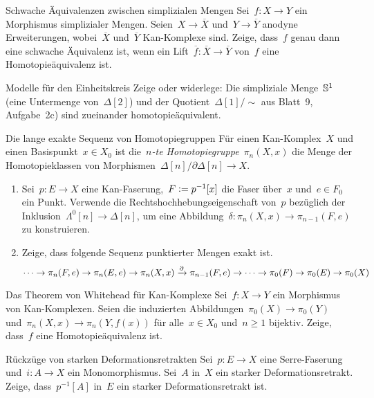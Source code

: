 \documentclass{uebblatt}
\begin{document}

\begin{aufgabe}{Schwache Äquivalenzen zwischen simplizialen Mengen}
Sei~$f : X \to Y$ ein Morphismus simplizialer Mengen. Seien~$X \to
\overline{X}$ und~$Y \to \overline{Y}$ anodyne Erweiterungen,
wobei~$\overline{X}$ und~$\overline{Y}$ Kan-Komplexe sind. Zeige, dass~$f$
genau dann eine schwache Äquivalenz ist, wenn ein Lift~$\overline{f} :
\overline{X} \to \overline{Y}$ von~$f$ eine Homotopieäquivalenz ist.
\end{aufgabe}

\begin{aufgabe}{Modelle für den Einheitskreis}
Zeige oder widerlege: Die simpliziale Menge~$\mathbb{S}^1$ (eine Untermenge
von~$\Delta[2]$) und der Quotient~$\Delta[1]/{\sim}$ aus Blatt~9, Aufgabe~2c)
sind zueinander homotopieäquivalent.
\end{aufgabe}

\begin{aufgabe}{Die lange exakte Sequenz von Homotopiegruppen}
Für einen Kan-Komplex~$X$ und einen Basispunkt~$x \in X_0$ ist die~\emph{$n$-te
Homotopiegruppe}~$\pi_n(X,x)$ die Menge der Homotopieklassen von
Morphismen~$\Delta[n]/\partial \Delta[n] \to X$.
\begin{enumerate}
\item Sei~$p : E \to X$ eine Kan-Faserung,~$F \vcentcolon= p^{-1}[x]$ die Faser
über~$x$ und~$e \in F_0$ ein Punkt. Verwende die Rechtshochhebungseigenschaft
von~$p$ bezüglich der Inklusion~$\Lambda^0[n] \to \Delta[n]$, um eine
Abbildung~$\delta : \pi_n(X,x) \to \pi_{n-1}(F,e)$ zu konstruieren.
\item Zeige, dass folgende Sequenz punktierter Mengen exakt ist.
\[ \cdots \to \pi_n(F,e) \to \pi_n(E,e) \to \pi_n(X,x) \xrightarrow{\partial}
\pi_{n-1}(F,e) \to \cdots \to \pi_0(F) \to \pi_0(E) \to \pi_0(X) \]
\end{enumerate}
\end{aufgabe}
\vspace{-1em}

\begin{aufgabe}{Das Theorem von Whitehead für Kan-Komplexe}
Sei~$f : X \to Y$ ein Morphismus von Kan-Komplexen. Seien die induzierten
Abbildungen~$\pi_0(X) \to \pi_0(Y)$ und~$\pi_n(X,x) \to \pi_n(Y,f(x))$ für
alle~$x \in X_0$ und~$n \geq 1$ bijektiv. Zeige, dass~$f$ eine
Homotopieäquivalenz ist.
\end{aufgabe}

\begin{aufgabe}{Rückzüge von starken Deformationsretrakten}
Sei~$p : E \to X$ eine Serre-Faserung und~$i : A \to X$ ein Monomorphismus.
Sei~$A$ in~$X$ ein starker Deformationsretrakt. Zeige, dass~$p^{-1}[A]$ in~$E$
ein starker Deformationsretrakt ist.
\end{aufgabe}
\end{document}
